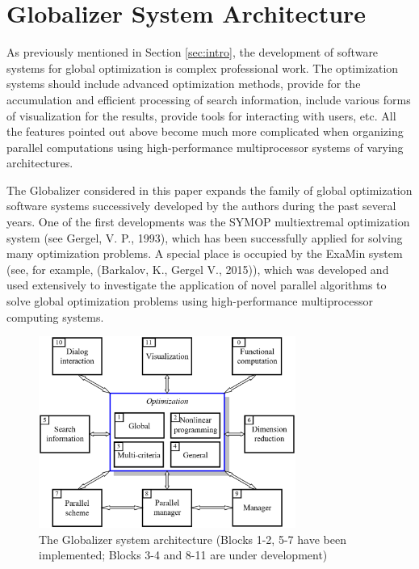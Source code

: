 \documentclass{gOMS2e}
\theoremstyle{plain}%
\theoremstyle{definition}
\theoremstyle{remark}
\begin{document}
\section{Globalizer System Architecture}
\label{sec:arch}
As previously mentioned in Section \ref{sec:intro}, the development of software systems
for global optimization is complex professional work. The optimization systems should
include advanced optimization methods, provide for the accumulation and efficient
processing of search information, include various forms of visualization for the results,
provide tools for interacting with users, etc. All the features pointed out above
become much more complicated when organizing parallel computations using high-performance
multiprocessor systems of varying architectures.
\par
The Globalizer considered in this paper expands the family of global optimization
software systems successively developed by the authors during the past several years.
One of the first developments was the SYMOP multiextremal optimization system (see Gergel, V. P., 1993),
which has been successfully applied for solving many optimization problems. A special
place is occupied by the ExaMin system (see, for example, (Barkalov, K., Gergel V., 2015)),
which was developed and used extensively to investigate the application of novel parallel
algorithms to solve global optimization problems using high-performance multiprocessor computing systems.

\begin{figure}[h!]
    \centering
		\includegraphics[width=0.75\textwidth]{pictures/globalizerScheme.eps}
		\caption{The Globalizer system architecture (Blocks 1-2, 5-7 have been implemented; Blocks 3-4 and 8-11 are under development)}
    \label{fig:globalizerScheme}
\end{figure}
\end{document}
